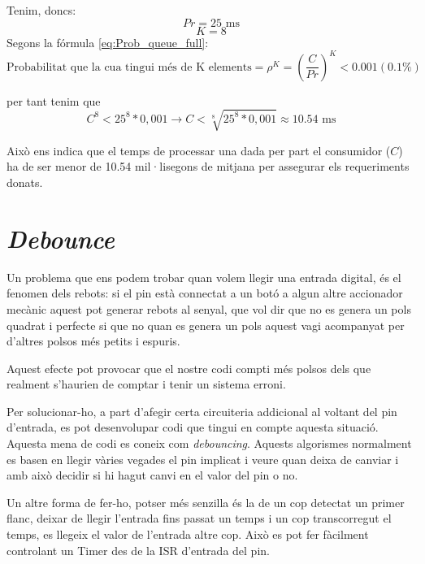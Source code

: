 Tenim, doncs:
\begin{equation*}
 Pr = 25 \text{ ms}
\end{equation*}
\begin{equation*}
 K = 8
\end{equation*}
Segons la fórmula \ref{eq:Prob_queue_full}:
\begin{equation*}
 \text{Probabilitat que la cua tingui més de K elements} = \rho^K =  (\frac{C}{Pr})^K < 0.001 (0.1\%)
\end{equation*}

per tant tenim que
\begin{equation*}
C^8 < 25^8*0,001  \rightarrow C < \sqrt[8]{25^8 * 0,001} \approx 10.54 \text{ ms}
\end{equation*}

Això ens indica que el temps de processar una dada per part el consumidor ($C$) ha de ser menor de 10.54 mil·lisegons de mitjana per assegurar els requeriments donats.


\section{\em Debounce}

Un problema que ens podem trobar quan volem llegir una entrada digital, és el fenomen dels rebots: si el pin està connectat a un botó a algun altre accionador mecànic aquest pot generar rebots al senyal, que vol dir que no es genera un pols quadrat i perfecte si que no quan es genera un pols aquest vagi acompanyat per d'altres polsos més petits i espuris.

Aquest efecte pot provocar que el nostre codi compti més polsos dels que realment s'haurien de comptar i tenir un sistema erroni.

Per solucionar-ho, a part d'afegir certa circuiteria addicional al voltant del pin d'entrada, es pot desenvolupar codi que tingui en compte aquesta situació. Aquesta mena de codi es coneix com {\em debouncing}. Aquests algorismes normalment es basen en llegir vàries vegades el pin implicat i veure quan deixa de canviar i amb això decidir si hi hagut canvi en el valor del pin o no.

Un altre forma de fer-ho, potser més senzilla és la de un cop detectat un primer flanc, deixar de llegir l'entrada fins passat un temps i un cop transcorregut el temps, es llegeix el valor de l'entrada altre cop. Això es pot fer fàcilment controlant un Timer des de la ISR d'entrada del pin.


